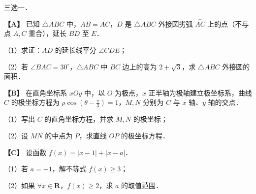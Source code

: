 \begin{question}
三选一．

\textbf{【A】} 已知 $\triangle ABC$ 中，$AB=AC$，$D$ 是 $\triangle ABC$ 外接圆劣弧 $\overset{\frown}{AC}$ 上的点（不与点 $A,C$ 重合），延长 $BD$ 至 $E$．

（1）求证：$AD$ 的延长线平分 $\angle CDE$；

（2）若 $\angle BAC=30^\circ$，$\triangle ABC$ 中 $BC$ 边上的高为 $2+\sqrt3$，求 $\triangle ABC$ 外接圆的面积．

\textbf{【B】} 在直角坐标系 $xOy$ 中，以 $O$ 为极点，$x$ 正半轴为极轴建立极坐标系，曲线 $C$ 的极坐标方程为 $\rho\cos\left(\theta-\frac{\pi}{3}\right)=1$，$M,N$ 分别为 $C$ 与 $x$ 轴、$y$ 轴的交点．

（1）写出 $C$ 的直角坐标方程，并求 $M,N$ 的极坐标；

（2）设 $MN$ 的中点为 $P$，求直线 $OP$ 的极坐标方程．

\textbf{【C】} 设函数 $f(x)=|x-1|+|x-a|$．

（1）若 $a=-1$，解不等式 $f(x)\geqslant3$；

（2）如果 $\forall x\in\mathbf R$，$f(x)\geqslant2$，求 $a$ 的取值范围．
\nopagebreak[4]
\begin{center}\end{center}
\nopagebreak[4]

\end{question}